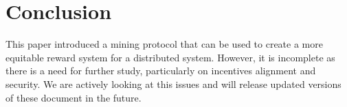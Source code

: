 \section{Conclusion}

This paper introduced a mining protocol that can be used to create a more equitable reward system for a distributed system. However, it is incomplete as there is a need for further study, particularly on incentives alignment and security. We are actively looking at this issues and will release updated versions of these document in the future. 





















 
